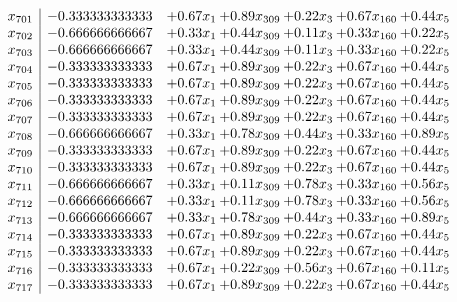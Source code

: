 \documentclass[8pt]{article}
\begin{document}
\[\begin{array}{c| c c@{\hskip 2pt} c@{\hskip 2pt} c@{\hskip 2pt} c@{\hskip 2pt} c@{\hskip 2pt} }
 x_{701}   &  -0.333333333333 & +  0.67 x_{1} & +  0.89 x_{309} & +  0.22 x_{3} & +  0.67 x_{160} & +  0.44 x_{5}\\
 x_{702}   &  -0.666666666667 & +  0.33 x_{1} & +  0.44 x_{309} & +  0.11 x_{3} & +  0.33 x_{160} & +  0.22 x_{5}\\
 x_{703}   &  -0.666666666667 & +  0.33 x_{1} & +  0.44 x_{309} & +  0.11 x_{3} & +  0.33 x_{160} & +  0.22 x_{5}\\
 x_{704}   &  -0.333333333333 & +  0.67 x_{1} & +  0.89 x_{309} & +  0.22 x_{3} & +  0.67 x_{160} & +  0.44 x_{5}\\
 x_{705}   &  -0.333333333333 & +  0.67 x_{1} & +  0.89 x_{309} & +  0.22 x_{3} & +  0.67 x_{160} & +  0.44 x_{5}\\
 x_{706}   &  -0.333333333333 & +  0.67 x_{1} & +  0.89 x_{309} & +  0.22 x_{3} & +  0.67 x_{160} & +  0.44 x_{5}\\
 x_{707}   &  -0.333333333333 & +  0.67 x_{1} & +  0.89 x_{309} & +  0.22 x_{3} & +  0.67 x_{160} & +  0.44 x_{5}\\
 x_{708}   &  -0.666666666667 & +  0.33 x_{1} & +  0.78 x_{309} & +  0.44 x_{3} & +  0.33 x_{160} & +  0.89 x_{5}\\
 x_{709}   &  -0.333333333333 & +  0.67 x_{1} & +  0.89 x_{309} & +  0.22 x_{3} & +  0.67 x_{160} & +  0.44 x_{5}\\
 x_{710}   &  -0.333333333333 & +  0.67 x_{1} & +  0.89 x_{309} & +  0.22 x_{3} & +  0.67 x_{160} & +  0.44 x_{5}\\
 x_{711}   &  -0.666666666667 & +  0.33 x_{1} & +  0.11 x_{309} & +  0.78 x_{3} & +  0.33 x_{160} & +  0.56 x_{5}\\
 x_{712}   &  -0.666666666667 & +  0.33 x_{1} & +  0.11 x_{309} & +  0.78 x_{3} & +  0.33 x_{160} & +  0.56 x_{5}\\
 x_{713}   &  -0.666666666667 & +  0.33 x_{1} & +  0.78 x_{309} & +  0.44 x_{3} & +  0.33 x_{160} & +  0.89 x_{5}\\
 x_{714}   &  -0.333333333333 & +  0.67 x_{1} & +  0.89 x_{309} & +  0.22 x_{3} & +  0.67 x_{160} & +  0.44 x_{5}\\
 x_{715}   &  -0.333333333333 & +  0.67 x_{1} & +  0.89 x_{309} & +  0.22 x_{3} & +  0.67 x_{160} & +  0.44 x_{5}\\
 x_{716}   &  -0.333333333333 & +  0.67 x_{1} & +  0.22 x_{309} & +  0.56 x_{3} & +  0.67 x_{160} & +  0.11 x_{5}\\
 x_{717}   &  -0.333333333333 & +  0.67 x_{1} & +  0.89 x_{309} & +  0.22 x_{3} & +  0.67 x_{160} & +  0.44 x_{5}\\

\end{array}\]
\end{document}
